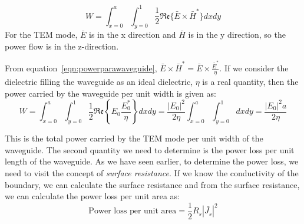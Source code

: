 \begin{equation}
W=\int_{x=0}^{a}\int_{y=0}^{1} \frac{1}{2}\mathfrak{Re}\lbrace\bar{E} \times \bar{H}^\ast\rbrace dxdy
\label{eqn:powerparawaveguide}	
\end{equation}
For the TEM mode, $\bar{E}$ is in the x direction and $\bar{H}$ is in the y direction, so the power flow is in the z-direction.

From equation~\eqref{eqn:powerparawaveguide}, $\bar{E} \times \bar{H}^\ast = \bar{E} \times \frac{\bar{E}^\ast}{\eta}$. If we consider the dielectric filling the waveguide as an ideal dielectric, $\eta$ is a real quantity, then the power carried by the waveguide per unit width is given as:
\begin{dmath}
W = \int_{x=0}^{a}\int_{y=0}^{1}\frac{1}{2}\mathfrak{Re}\left\lbrace E_0 \frac{E_0^\ast}{\eta}\right\rbrace dxdy
= \frac{\left|E_{0}\right|^2}{2\eta}\int_{x=0}^{a}\int_{y=0}^{1}dxdy 
= \frac{|E_0|^2a}{2\eta}
\label{eqn:powercarriedperunitwidth}
\end{dmath}

This is the total power carried by the TEM mode per unit width of the waveguide. The second quantity we need to determine is the power loss per unit length of the waveguide. As we have seen earlier, to determine the power loss, we need to visit the concept of \emph{surface resistance}. If we know the conductivity of the boundary, we can calculate the surface resistance and from the surface resistance, we can calculate the power loss per unit area as:
\begin{equation}
\text{Power loss per unit area} = \frac{1}{2}R_s|\bar{J_s}|^2 
\end{equation}

